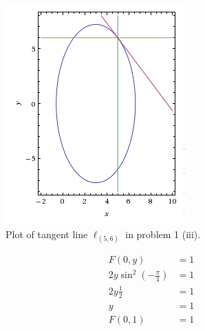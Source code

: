 \documentclass[a4paper,norsk,12pt]{article}
\begin{document}
\begin{figure}[h]
  \centering
  \includegraphics{ob1plot3.png}
  \caption{Plot of tangent line $\ell_{(5,6)}$ in problem 1 (iii).}
  \label{plot.p3}
\end{figure}








\begin{align*}
  F(0,y) &= 1 \\
  2y \sin^2(-\frac{\pi}{4}) &= 1 \\
  2y\frac{1}{2} &= 1 \\
  y &= 1 \\
  F(0,1) &= 1
\end{align*}
\end{document}
